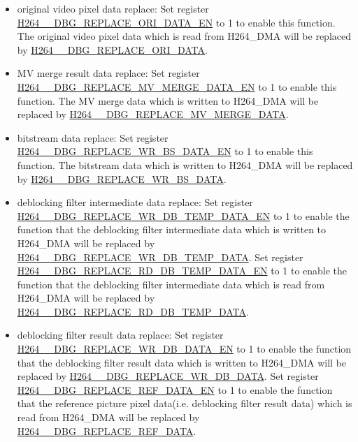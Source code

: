 \documentclass[main\_\_EN.tex]{subfiles}
\begin{document}
\begin{itemize}
    \item original video pixel data replace: Set register \hyperref[fielddesc:H264DBGREPLACEORIDATAEN]{H264\_\_DBG\_REPLACE\_ORI\_DATA\_EN} to 1 to enable this function. The original video pixel data which is read from H264\_DMA will be replaced by \hyperref[fielddesc:H264DBGREPLACEORIDATA]{H264\_\_DBG\_REPLACE\_ORI\_DATA}.
    \item MV merge result data replace: Set register \hyperref[fielddesc:H264DBGREPLACEMVMERGEDATAEN]{H264\_\_DBG\_REPLACE\_MV\_MERGE\_DATA\_EN} to 1 to enable this function. The MV merge data which is written to H264\_DMA will be replaced by \hyperref[fielddesc:H264DBGREPLACEMVMERGEDATA]{H264\_\_DBG\_REPLACE\_MV\_MERGE\_DATA}.
    \item bitstream data replace: Set register \hyperref[fielddesc:H264DBGREPLACEWRBSDATAEN]{H264\_\_DBG\_REPLACE\_WR\_BS\_DATA\_EN} to 1 to enable this function. The bitstream data which is written to H264\_DMA will be replaced by \hyperref[fielddesc:H264DBGREPLACEWRBSDATA]{H264\_\_DBG\_REPLACE\_WR\_BS\_DATA}.
    \item deblocking filter intermediate data replace: Set register \hyperref[fielddesc:H264DBGREPLACEWRDBTEMPDATAEN]{H264\_\_DBG\_REPLACE\_WR\_DB\_TEMP\_DATA\_EN} to 1 to enable the function that the deblocking filter intermediate data which is written to H264\_DMA will be replaced by \hyperref[fielddesc:H264DBGREPLACEWRDBTEMPDATA]{H264\_\_DBG\_REPLACE\_WR\_DB\_TEMP\_DATA}. Set register \hyperref[fielddesc:H264DBGREPLACERDDBTEMPDATAEN]{H264\_\_DBG\_REPLACE\_RD\_DB\_TEMP\_DATA\_EN} to 1 to enable the function that the deblocking filter intermediate data which is read from H264\_DMA will be replaced by \hyperref[fielddesc:H264DBGREPLACERDDBTEMPDATA]{H264\_\_DBG\_REPLACE\_RD\_DB\_TEMP\_DATA}.
    \item deblocking filter result data replace: Set register \hyperref[fielddesc:H264DBGREPLACEWRDBDATAEN]{H264\_\_DBG\_REPLACE\_WR\_DB\_DATA\_EN} to 1 to enable the function that the deblocking filter result data which is written to H264\_DMA will be replaced by \hyperref[fielddesc:H264DBGREPLACEWRDBDATA]{H264\_\_DBG\_REPLACE\_WR\_DB\_DATA}. Set register \hyperref[fielddesc:H264DBGREPLACEREFDATAEN]{H264\_\_DBG\_REPLACE\_REF\_DATA\_EN} to 1 to enable the function that the reference picture pixel data(i.e. deblocking filter result data) which is read from H264\_DMA will be replaced by \hyperref[fielddesc:H264DBGREPLACEREFDATA]{H264\_\_DBG\_REPLACE\_REF\_DATA}.
\end{itemize}
\end{document}
